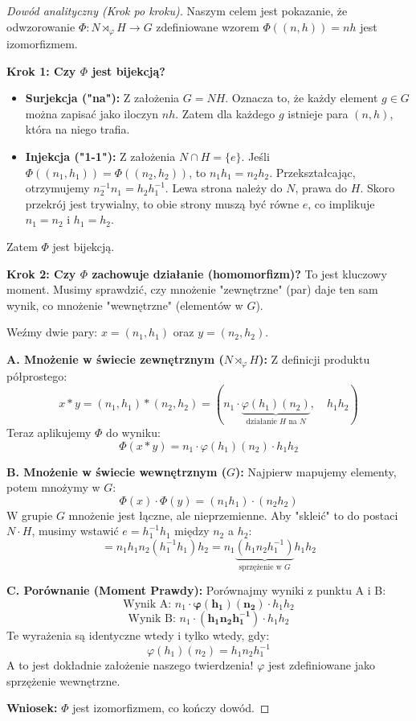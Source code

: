 \begin{proof}[Dowód analityczny (Krok po kroku)]

Naszym celem jest pokazanie, że odwzorowanie $\Phi: N \rtimes_\varphi H \to G$ zdefiniowane wzorem $\Phi((n,h)) = nh$ jest izomorfizmem.

\textbf{Krok 1: Czy $\Phi$ jest bijekcją?}
\begin{itemize}
    \item \textbf{Surjekcja ("na"):} Z założenia $G = NH$. Oznacza to, że każdy element $g \in G$ można zapisać jako iloczyn $nh$. Zatem dla każdego $g$ istnieje para $(n,h)$, która na niego trafia.
    \item \textbf{Injekcja ("1-1"):} Z założenia $N \cap H = \{e\}$. Jeśli $\Phi((n_1, h_1)) = \Phi((n_2, h_2))$, to $n_1 h_1 = n_2 h_2$. Przekształcając, otrzymujemy $n_2^{-1} n_1 = h_2 h_1^{-1}$. Lewa strona należy do $N$, prawa do $H$. Skoro przekrój jest trywialny, to obie strony muszą być równe $e$, co implikuje $n_1=n_2$ i $h_1=h_2$.
\end{itemize}
Zatem $\Phi$ jest bijekcją.

\textbf{Krok 2: Czy $\Phi$ zachowuje działanie (homomorfizm)?}
To jest kluczowy moment. Musimy sprawdzić, czy mnożenie "zewnętrzne" (par) daje ten sam wynik, co mnożenie "wewnętrzne" (elementów w $G$).

Weźmy dwie pary: $x = (n_1, h_1)$ oraz $y = (n_2, h_2)$.

\noindent\textbf{A. Mnożenie w świecie zewnętrznym ($N \rtimes_\varphi H$):}
Z definicji produktu półprostego:
\[ x * y = (n_1, h_1) * (n_2, h_2) = (n_1 \cdot \underbrace{\varphi(h_1)(n_2)}_{\text{działanie } H \text{ na } N}, \quad h_1 h_2) \]
Teraz aplikujemy $\Phi$ do wyniku:
\[ \Phi(x * y) = n_1 \cdot \varphi(h_1)(n_2) \cdot h_1 h_2 \]

\noindent\textbf{B. Mnożenie w świecie wewnętrznym ($G$):}
Najpierw mapujemy elementy, potem mnożymy w $G$:
\[ \Phi(x) \cdot \Phi(y) = (n_1 h_1) \cdot (n_2 h_2) \]
W grupie $G$ mnożenie jest łączne, ale nieprzemienne. Aby "skleić" to do postaci $N \cdot H$, musimy wstawić $e = h_1^{-1} h_1$ między $n_2$ a $h_2$:
\[ = n_1 h_1 n_2 (h_1^{-1} h_1) h_2 = n_1 \underbrace{(h_1 n_2 h_1^{-1})}_{\text{sprzężenie w } G} h_1 h_2 \]

\noindent\textbf{C. Porównanie (Moment Prawdy):}
Porównajmy wyniki z punktu A i B:
\[ \text{Wynik A: } n_1 \cdot \bm{\varphi(h_1)(n_2)} \cdot h_1 h_2 \]
\[ \text{Wynik B: } n_1 \cdot \bm{(h_1 n_2 h_1^{-1})} \cdot h_1 h_2 \]
Te wyrażenia są identyczne wtedy i tylko wtedy, gdy:
\[ \varphi(h_1)(n_2) = h_1 n_2 h_1^{-1} \]
A to jest dokładnie założenie naszego twierdzenia! $\varphi$ jest zdefiniowane jako sprzężenie wewnętrzne.

\textbf{Wniosek:} $\Phi$ jest izomorfizmem, co kończy dowód.
\end{proof}

